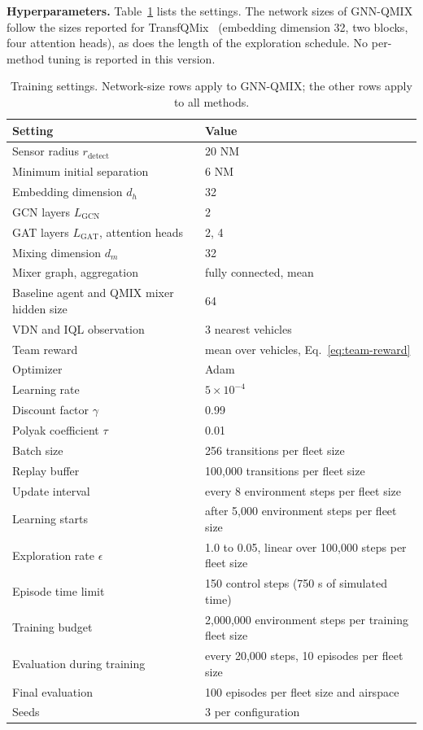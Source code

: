 \textbf{Hyperparameters.} Table~\ref{tab:hyper} lists the settings. The network sizes of
GNN-QMIX follow the sizes reported for TransfQMix~\cite{transfqmix} (embedding dimension 32,
two blocks, four attention heads), as does the length of the exploration schedule. No
per-method tuning is reported in this version.

\begin{table}[hbt!]
\caption{\label{tab:hyper} Training settings. Network-size rows apply to GNN-QMIX; the other
rows apply to all methods.}
\centering
\begin{tabular}{ll}
\hline
Setting & Value \\
\hline
Sensor radius $r_{\text{detect}}$ & 20 NM \\
Minimum initial separation & 6 NM \\
Embedding dimension $d_h$ & 32 \\
GCN layers $L_{\text{GCN}}$ & 2 \\
GAT layers $L_{\text{GAT}}$, attention heads & 2, 4 \\
Mixing dimension $d_m$ & 32 \\
Mixer graph, aggregation & fully connected, mean \\
Baseline agent and QMIX mixer hidden size & 64 \\
VDN and IQL observation & 3 nearest vehicles \\
Team reward & mean over vehicles, Eq.~\eqref{eq:team-reward} \\
Optimizer & Adam \\
Learning rate & $5\times10^{-4}$ \\
Discount factor $\gamma$ & 0.99 \\
Polyak coefficient $\tau$ & 0.01 \\
Batch size & 256 transitions per fleet size \\
Replay buffer & 100,000 transitions per fleet size \\
Update interval & every 8 environment steps per fleet size \\
Learning starts & after 5,000 environment steps per fleet size \\
Exploration rate $\epsilon$ & 1.0 to 0.05, linear over 100,000 steps per fleet size \\
Episode time limit & 150 control steps (750 s of simulated time) \\
Training budget & 2,000,000 environment steps per training fleet size \\
Evaluation during training & every 20,000 steps, 10 episodes per fleet size \\
Final evaluation & 100 episodes per fleet size and airspace \\
Seeds & 3 per configuration \\
\hline
\end{tabular}
\end{table}

